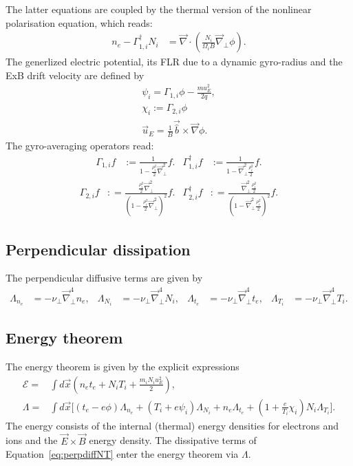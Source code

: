 The latter equations are coupled by the thermal version of the nonlinear polarisation equation, which reads:
\begin{align}
  n_e -\Gamma_{1,i}^\dagger N_i &= \vec{\nabla} \cdot\left(\frac{N_i}{\Omega_i B} \vec{\nabla}_\perp \phi\right).
\end{align}
The generlized electric potential, its FLR due to a dynamic gyro-radius and the ExB drift velocity are defined by
\begin{align}
 \psi_i  = \Gamma_{1,i} \phi - \frac{m u_E^2 }{2 q}, \\ 
 \chi_i := \Gamma_{2,i} \phi \\
 \vec{u}_E = \frac{1}{B} \vec{\hat{b}} \times \vec{\nabla} \phi .
\end{align}
The gyro-averaging operators read:
\begin{align}\label{eq:gamma1def} 
 \Gamma_{1,i} f&:= \frac{1}{1-\frac{\rho_i^2}{2}\vec{\nabla}_\perp^2} f. & 
  \Gamma_{1,i}^\dagger f&:= \frac{1}{1-\vec{\nabla}_\perp^2\frac{\rho_i^2}{2}} f.
\end{align}
\begin{align}\label{eq:gamma2def}
 \Gamma_{2,i} f&: = \frac{\frac{\rho_i^2}{2}\vec{\nabla}_\perp^2}{\left(1-\frac{\rho_i^2}{2}\vec{\nabla}_\perp^2\right)^2} f.&
 \Gamma_{2,i}^\dagger f&: = \frac{\vec{\nabla}_\perp^2\frac{\rho_i^2}{2}}{\left(1-\vec{\nabla}_\perp^2\frac{\rho_i^2}{2}\right)^2} f. 
\end{align}
\subsection{Perpendicular dissipation}
The perpendicular diffusive terms are given by
\begin{align}\label{eq:perpdiffNT}
 \Lambda_{n_e} &=  -\nu_\perp \vec{\nabla}_\perp^4 n_e, &
 \Lambda_{N_i} &=  -\nu_\perp \vec{\nabla}_\perp^4 N_i, &
 \Lambda_{t_e} &=  -\nu_\perp \vec{\nabla}_\perp^4 t_e, &
 \Lambda_{T_i} &=  -\nu_\perp \vec{\nabla}_\perp^4 T_i.
\end{align}
\subsection{Energy theorem}
The energy theorem is given by the explicit expressions
\begin{align}\label{eq:energytheorem}
 \mathcal{E} =& \int d\vec{x} \left(n_e t_{e} +N_i T_{i} + \frac{m_i N_i u_E^2}{2} \right) , \\
\Lambda = &
 \int d\vec{x}  \bigg[\left(t_{e} - e \phi \right) \Lambda_{n_e}  +\left(T_{i} + e \psi_i \right) \Lambda_{N_i}  +
  n_e  \Lambda_{t_{e}}+ 
 \left(1+\frac{e}{T_{i}} \chi_i\right)N_i  \Lambda_{T_{i}}\bigg].
\end{align}
The energy consists of the internal (thermal) energy densities for electrons and ions and the $\vec{E}\times\vec{B}$ energy density. 
The dissipative terms of Equation~\eqref{eq:perpdiffNT} enter the energy theorem via $\Lambda$. \\
